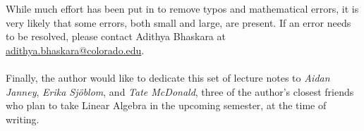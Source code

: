 \vphantom
\\
\\
While much effort has been put in to remove typos and mathematical errors, it is very likely that some errors, both small and large, are present. If an error needs to be resolved, please contact Adithya Bhaskara at \href{mailto:adithya.bhaskara@colorado.edu}{adithya.bhaskara@colorado.edu}.
\\
\\
Finally, the author would like to dedicate this set of lecture notes to \textit{Aidan Janney}, \textit{Erika Sj\"{o}blom}, and \textit{Tate McDonald}, three of the author's closest friends who plan to take Linear Algebra in the upcoming semester, at the time of writing.
\\
\\
\vfill
{}